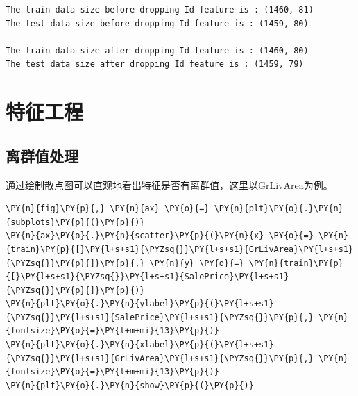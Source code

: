 \documentclass[no-math]{YangThesis}
\begin{document}
\begin{Verbatim}[commandchars=\\\{\}]
The train data size before dropping Id feature is : (1460, 81)
The test data size before dropping Id feature is : (1459, 80)

The train data size after dropping Id feature is : (1460, 80)
The test data size after dropping Id feature is : (1459, 79)
\end{Verbatim}

\hypertarget{ux7279ux5f81ux5de5ux7a0b}{%
	\section{特征工程}\label{ux7279ux5f81ux5de5ux7a0b}}

\hypertarget{ux79bbux7fa4ux503cux5904ux7406}{%
	\subsection{离群值处理}\label{ux79bbux7fa4ux503cux5904ux7406}}

通过绘制散点图可以直观地看出特征是否有离群值，这里以GrLivArea为例。

\begin{tcolorbox}[breakable, size=fbox, boxrule=1pt, pad at break*=1mm,colback=cellbackground, colframe=cellborder]
	\begin{Verbatim}[commandchars=\\\{\}]
\PY{n}{fig}\PY{p}{,} \PY{n}{ax} \PY{o}{=} \PY{n}{plt}\PY{o}{.}\PY{n}{subplots}\PY{p}{(}\PY{p}{)}
\PY{n}{ax}\PY{o}{.}\PY{n}{scatter}\PY{p}{(}\PY{n}{x} \PY{o}{=} \PY{n}{train}\PY{p}{[}\PY{l+s+s1}{\PYZsq{}}\PY{l+s+s1}{GrLivArea}\PY{l+s+s1}{\PYZsq{}}\PY{p}{]}\PY{p}{,} \PY{n}{y} \PY{o}{=} \PY{n}{train}\PY{p}{[}\PY{l+s+s1}{\PYZsq{}}\PY{l+s+s1}{SalePrice}\PY{l+s+s1}{\PYZsq{}}\PY{p}{]}\PY{p}{)}
\PY{n}{plt}\PY{o}{.}\PY{n}{ylabel}\PY{p}{(}\PY{l+s+s1}{\PYZsq{}}\PY{l+s+s1}{SalePrice}\PY{l+s+s1}{\PYZsq{}}\PY{p}{,} \PY{n}{fontsize}\PY{o}{=}\PY{l+m+mi}{13}\PY{p}{)}
\PY{n}{plt}\PY{o}{.}\PY{n}{xlabel}\PY{p}{(}\PY{l+s+s1}{\PYZsq{}}\PY{l+s+s1}{GrLivArea}\PY{l+s+s1}{\PYZsq{}}\PY{p}{,} \PY{n}{fontsize}\PY{o}{=}\PY{l+m+mi}{13}\PY{p}{)}
\PY{n}{plt}\PY{o}{.}\PY{n}{show}\PY{p}{(}\PY{p}{)}
	\end{Verbatim}
\end{tcolorbox}

\begin{center}
\end{center}
{ \hspace*{\fill} \\}
\end{document}

